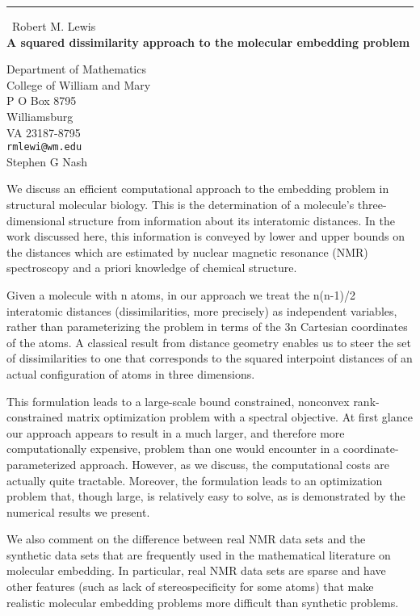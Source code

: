 \documentclass{report}
\begin{document}
\begin{center}
\rule{6in}{1pt} \
{\large Robert M. Lewis \\
{\bf A squared dissimilarity approach to the molecular embedding problem}}

Department of Mathematics \\ College of William and Mary \\ P O Box 8795 \\ Williamsburg \\ VA 23187-8795
\\
{\tt rmlewi@wm.edu}\\
Stephen G Nash\end{center}

We discuss an efficient computational approach to the embedding problem
in structural molecular biology.  This is the determination of a
molecule's three-dimensional structure from information about its
interatomic distances.  In the work discussed here, this information is
conveyed by lower and upper bounds on the distances which are estimated
by nuclear magnetic resonance (NMR) spectroscopy and a priori knowledge
of chemical structure.

Given a molecule with n atoms, in our approach we treat the n(n-1)/2
interatomic distances (dissimilarities, more precisely) as independent
variables, rather than parameterizing the problem in terms of the 3n
Cartesian coordinates of the atoms.  A classical result from distance
geometry enables us to steer the set of dissimilarities to one that
corresponds to the squared interpoint distances of an actual
configuration of atoms in three dimensions.

This formulation leads to a large-scale bound constrained, nonconvex
rank-constrained matrix optimization problem with a spectral objective.
 At first glance our approach appears to result in a much
larger, and therefore more computationally expensive, problem than one
would encounter in a coordinate-parameterized approach.  However, as we
discuss, the computational costs are actually quite tractable. Moreover,
the formulation leads to an optimization problem that, though
large, is relatively easy to solve, as is demonstrated by the numerical
results we present.

We also comment on the difference between real NMR data sets and the
synthetic data sets that are frequently used in the mathematical
literature on molecular embedding.  In particular, real NMR data sets
are sparse and have other features (such as lack of stereospecificity
for some atoms) that make realistic molecular embedding problems more
difficult than synthetic problems.
\end{document}
